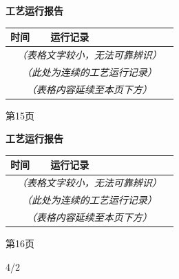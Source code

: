 \documentclass[UTF8,10pt,a4paper,fontset=fandol]{ctexart}
\newcommand{\handwritten}[1]{#1}
\begin{document}
\noindent
\begin{minipage}[t]{0.48\textwidth}
\centering
\textbf{工艺运行报告}

\vspace{0.3em}
\begin{tabular}{|p{0.22\linewidth}|p{0.70\linewidth}|}
\hline
时间 & 运行记录 \\ \hline
\multicolumn{2}{|c|}{\textit{（表格文字较小，无法可靠辨识）}} \\ \hline
\multicolumn{2}{|c|}{\textit{（此处为连续的工艺运行记录）}} \\ \hline
\multicolumn{2}{|c|}{\textit{（表格内容延续至本页下方）}} \\ \hline
\end{tabular}

\vfill
第15页
\end{minipage}
\hfill
\begin{minipage}[t]{0.48\textwidth}
\centering
\textbf{工艺运行报告}

\vspace{0.3em}
\begin{tabular}{|p{0.22\linewidth}|p{0.70\linewidth}|}
\hline
时间 & 运行记录 \\ \hline
\multicolumn{2}{|c|}{\textit{（表格文字较小，无法可靠辨识）}} \\ \hline
\multicolumn{2}{|c|}{\textit{（此处为连续的工艺运行记录）}} \\ \hline
\multicolumn{2}{|c|}{\textit{（表格内容延续至本页下方）}} \\ \hline
\end{tabular}

\vfill
第16页
\end{minipage}

\vspace{1em}

\handwritten{4/2}

\newpage
\end{document}
